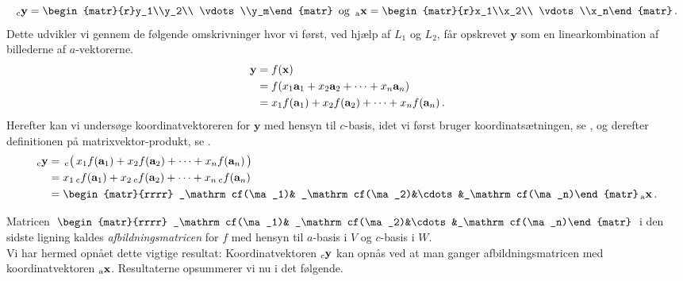 $$\vekind cy=\begin{matr}{r}y_1\\y_2\\ \vdots \\y_m\end{matr}\mathrm{\,\,\,og\,\,\,}
\vekind ax=\begin{matr}{r}x_1\\x_2\\ \vdots \\x_n\end{matr}\,.$$
Dette udvikler vi gennem de følgende omskrivninger hvor vi først, ved hjælp af $L_1$ og $L_2$, får opskrevet $\mathbf y$ som en linearkombination af billederne af $a$-vektorerne.
\begin{align*}
\mathbf y&=f(\mathbf x)\\
&=f(x_1\mathbf{a}_1+x_2\mathbf{a}_2+\cdots+x_n\mathbf{a}_n)\\
&=x_1f(\mathbf{a}_1)+x_2f(\mathbf{a}_2)+\cdots+x_nf(\mathbf{a}_n)\,.
\end{align*}
Herefter kan vi undersøge koordinatvektoreren for $\mathbf y$ med hensyn til $c$-basis, idet vi først bruger koordinatsætningen, se , og derefter definitionen på matrixvektor-produkt, se .
\begin{align*}
\vekind cy&=\, _\mathrm c\big(\,x_1f(\ma_1)+x_2f(\ma_2)+\cdots+x_nf(\ma_n)\,\big)\\
&=x_1\,_\mathrm cf(\ma_1)+x_2\,_\mathrm cf(\ma_2)+\cdots+x_n\,_\mathrm cf(\ma_n)\\
&=\begin{matr}{rrrr}
_\mathrm cf(\ma_1)& _\mathrm cf(\ma_2)&\cdots&_\mathrm cf(\ma_n)\end{matr}\,\vekind ax\,.
\end{align*}

Matricen $\,\begin{matr}{rrrr}
_\mathrm cf(\ma_1)& _\mathrm cf(\ma_2)&\cdots&_\mathrm cf(\ma_n)\end{matr}\,$ i den sidste ligning kaldes \textit{afbildningsmatricen} for $f$ med hensyn til $a$-basis i $V$ og $c$-basis  i $W$.\\

Vi har hermed opnået dette vigtige resultat: Koordinatvektoren ${_\mathrm{c}\mathbf{y}}$ kan opnås ved at man ganger afbildningsmatricen med koordinatvektoren ${_\mathrm{a}\mathbf{x}}$. Resultaterne opsummerer vi nu i det følgende.

